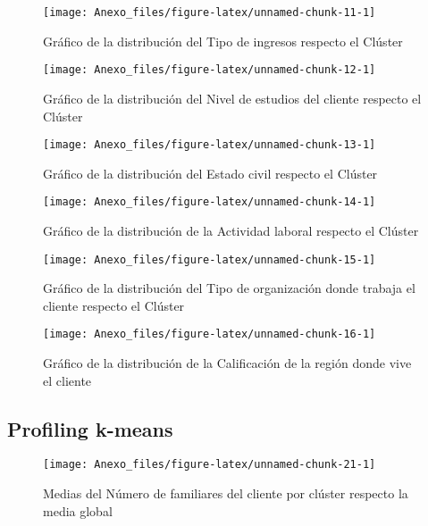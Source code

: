 \documentclass[
]{article}
\begin{document}
\begin{figure}
\texttt{[image: Anexo\_files/figure-latex/unnamed-chunk-11-1]} \caption{Gráfico de la distribución del Tipo de ingresos respecto el Clúster}\label{fig:unnamed-chunk-11}
\end{figure}

\begin{figure}
\texttt{[image: Anexo\_files/figure-latex/unnamed-chunk-12-1]} \caption{Gráfico de la distribución del Nivel de estudios del cliente respecto el Clúster}\label{fig:unnamed-chunk-12}
\end{figure}

\begin{figure}
\texttt{[image: Anexo\_files/figure-latex/unnamed-chunk-13-1]} \caption{Gráfico de la distribución del Estado civil respecto el Clúster}\label{fig:unnamed-chunk-13}
\end{figure}

\begin{figure}
\texttt{[image: Anexo\_files/figure-latex/unnamed-chunk-14-1]} \caption{Gráfico de la distribución de la Actividad laboral respecto el Clúster}\label{fig:unnamed-chunk-14}
\end{figure}

\begin{figure}
\texttt{[image: Anexo\_files/figure-latex/unnamed-chunk-15-1]} \caption{Gráfico de la distribución del Tipo de organización donde trabaja el cliente respecto el Clúster}\label{fig:unnamed-chunk-15}
\end{figure}

\begin{figure}
\texttt{[image: Anexo\_files/figure-latex/unnamed-chunk-16-1]} \caption{Gráfico de la distribución de la Calificación de la región donde vive el cliente}\label{fig:unnamed-chunk-16}
\end{figure}

\hypertarget{profiling-k-means}{%
\subsection{Profiling k-means}\label{profiling-k-means}}

\begin{figure}
\texttt{[image: Anexo\_files/figure-latex/unnamed-chunk-21-1]} \caption{Medias del Número de familiares del cliente por clúster respecto la media global}\label{fig:unnamed-chunk-21}
\end{figure}
\end{document}
